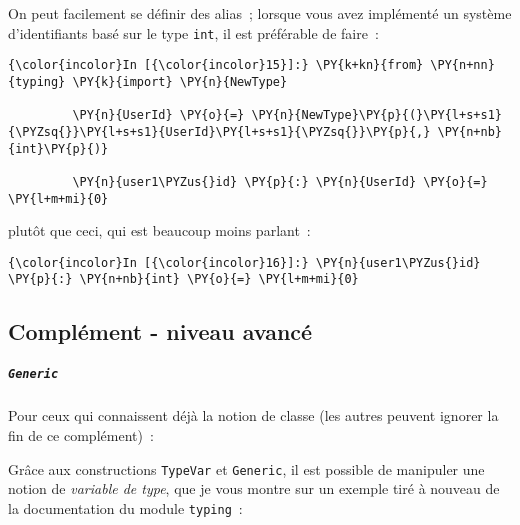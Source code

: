     On peut facilement se définir des alias~; lorsque vous avez implémenté
un système d'identifiants basé sur le type \texttt{int}, il est
préférable de faire~:

    \begin{Verbatim}[commandchars=\\\{\}]
{\color{incolor}In [{\color{incolor}15}]:} \PY{k+kn}{from} \PY{n+nn}{typing} \PY{k}{import} \PY{n}{NewType}
         
         \PY{n}{UserId} \PY{o}{=} \PY{n}{NewType}\PY{p}{(}\PY{l+s+s1}{\PYZsq{}}\PY{l+s+s1}{UserId}\PY{l+s+s1}{\PYZsq{}}\PY{p}{,} \PY{n+nb}{int}\PY{p}{)}
         
         \PY{n}{user1\PYZus{}id} \PY{p}{:} \PY{n}{UserId} \PY{o}{=} \PY{l+m+mi}{0}
\end{Verbatim}


    plutôt que ceci, qui est beaucoup moins parlant~:

    \begin{Verbatim}[commandchars=\\\{\}]
{\color{incolor}In [{\color{incolor}16}]:} \PY{n}{user1\PYZus{}id} \PY{p}{:} \PY{n+nb}{int} \PY{o}{=} \PY{l+m+mi}{0}
\end{Verbatim}


    \hypertarget{compluxe9ment---niveau-avancuxe9}{%
\subsection{Complément - niveau
avancé}\label{compluxe9ment---niveau-avancuxe9}}

    \hypertarget{generic}{%
\subparagraph{\texorpdfstring{\texttt{Generic}}{Generic}}\label{generic}}

    Pour ceux qui connaissent déjà la notion de classe (les autres peuvent
ignorer la fin de ce complément)~:

    Grâce aux constructions \texttt{TypeVar} et \texttt{Generic}, il est
possible de manipuler une notion de \emph{variable de type}, que je vous
montre sur un exemple tiré à nouveau de la documentation du module
\texttt{typing}~:

